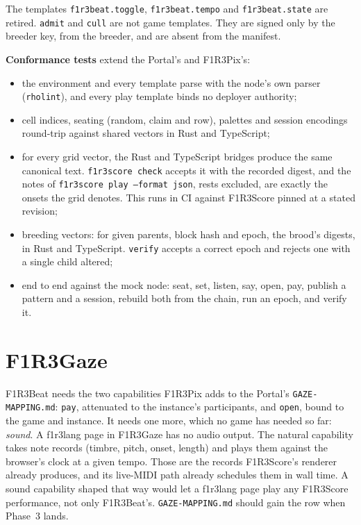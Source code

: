 \documentclass[11pt,a4paper]{article}
\newcommand{\code}[1]{\texttt{#1}}
\begin{document}
The templates \code{f1r3beat.toggle}, \code{f1r3beat.tempo} and \code{f1r3beat.state} are
retired. \code{admit} and \code{cull} are not game templates. They are signed only by the
breeder key, from the breeder, and are absent from the manifest.

\textbf{Conformance tests} extend the Portal's and F1R3Pix's:

\begin{itemize}[leftmargin=1.2em,itemsep=1pt]
\item the environment and every template parse with the node's own parser (\code{rholint}), and
  every play template binds no deployer authority;
\item cell indices, seating (random, claim and row), palettes and session encodings
  round-trip against shared vectors in Rust and TypeScript;
\item for every grid vector, the Rust and TypeScript bridges produce the same canonical text.
  \code{f1r3score check} accepts it with the recorded digest, and the notes of \code{f1r3score
  play --format json}, rests excluded, are exactly the onsets the grid denotes. This runs in CI
  against F1R3Score pinned at a stated revision;
\item breeding vectors: for given parents, block hash and epoch, the brood's digests, in Rust
  and TypeScript. \code{verify} accepts a correct epoch and rejects one with a single child
  altered;
\item end to end against the mock node: seat, set, listen, say, open, pay, publish a pattern and
  a session, rebuild both from the chain, run an epoch, and verify it.
\end{itemize}

\section{F1R3Gaze}\label{sec:gaze}

F1R3Beat needs the two capabilities F1R3Pix adds to the Portal's \code{GAZE-MAPPING.md}:
\code{pay}, attenuated to the instance's participants, and \code{open}, bound to the game and
instance. It needs one more, which no game has needed so far: \emph{sound}. A f1r3lang page in
F1R3Gaze has no audio output. The natural capability takes note records (timbre, pitch, onset,
length) and plays them against the browser's clock at a given tempo. Those are the records
F1R3Score's renderer already produces, and its live-MIDI path already schedules them in wall
time. A sound capability shaped that way would let a f1r3lang page play any F1R3Score
performance, not only F1R3Beat's. \code{GAZE-MAPPING.md} should gain the row when Phase~3 lands.
\end{document}
